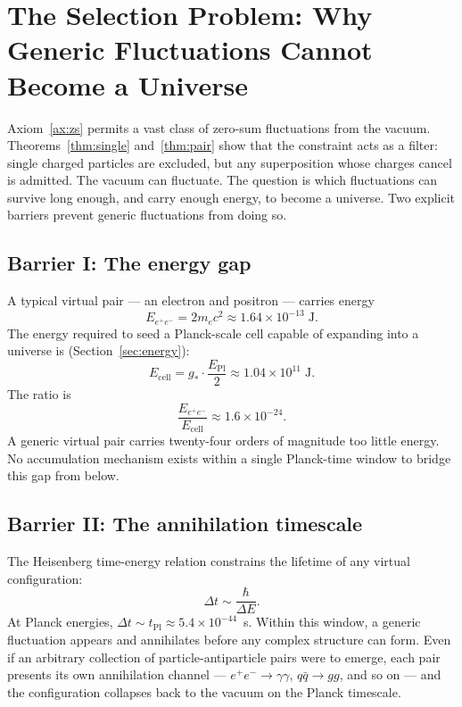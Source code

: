 \documentclass[12pt,a4paper]{article}
\theoremstyle{definition}
\theoremstyle{remark}
\newcommand{\EPl}{E_{\mathrm{Pl}}}
\newcommand{\tPl}{t_{\mathrm{Pl}}}
\newcommand{\gstar}{g_{*}}
\begin{document}
\section{The Selection Problem: Why Generic Fluctuations Cannot Become a Universe}
\label{sec:selection}

Axiom~\ref{ax:zs} permits a vast class of zero-sum fluctuations from the
vacuum. Theorems~\ref{thm:single} and~\ref{thm:pair} show that the constraint
acts as a filter: single charged particles are excluded, but any superposition
whose charges cancel is admitted. The vacuum can fluctuate. The question is
which fluctuations can survive long enough, and carry enough energy, to become
a universe. Two explicit barriers prevent generic fluctuations from doing so.

\subsection{Barrier I: The energy gap}

A typical virtual pair --- an electron and positron --- carries energy
\begin{equation}
  E_{e^+e^-} = 2m_e c^2 \approx 1.64 \times 10^{-13}\;\mathrm{J}.
\end{equation}
The energy required to seed a Planck-scale cell capable of expanding into
a universe is (Section~\ref{sec:energy}):
\begin{equation}
  E_{\mathrm{cell}} = \gstar \cdot \frac{\EPl}{2} \approx 1.04 \times 10^{11}\;\mathrm{J}.
\end{equation}
The ratio is
\begin{equation}
  \frac{E_{e^+e^-}}{E_{\mathrm{cell}}} \approx 1.6 \times 10^{-24}.
\end{equation}
A generic virtual pair carries twenty-four orders of magnitude too little
energy. No accumulation mechanism exists within a single Planck-time window
to bridge this gap from below.

\subsection{Barrier II: The annihilation timescale}

The Heisenberg time-energy relation constrains the lifetime of any virtual
configuration:
\begin{equation}
  \Delta t \sim \frac{\hbar}{\Delta E}.
\end{equation}
At Planck energies, $\Delta t \sim \tPl \approx 5.4 \times 10^{-44}$~s.
Within this window, a generic fluctuation appears and annihilates before
any complex structure can form. Even if an arbitrary collection of
particle-antiparticle pairs were to emerge, each pair presents its own
annihilation channel --- $e^+e^- \to \gamma\gamma$, $q\bar{q} \to gg$,
and so on --- and the configuration collapses back to the vacuum on the
Planck timescale.
\end{document}
